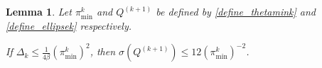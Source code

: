 \documentclass{article}
\newtheorem{lemma}[theorem]{Lemma}
\theoremstyle{case}
\numberwithin{theorem}{subsection}
\newcommand{\bsk}{{\beta_0^{(\star, k)}}}
\newcommand{\dacco}{{\Delta_{\textrm{a}}}}
\newcommand{\dk}{\Delta_k}
\newcommand{\naturals}{\mathbb N}
\newcommand{\thetamink}{{\pi^k_{\textrm{min}}}}
\newcommand{\qkpo}{{Q^{(k+1)}}}
\begin{document}
% 



\begin{lemma}
\label{boundbeta}
Let $\thetamink$ and $\qkpo$ be defined by \cref{define_thetamink} and \cref{define_ellipsek} respectively.

If $\dk \le \frac 1 {4 \beta} \left(\thetamink\right)^2$, then $\sigma\left(\qkpo\right) \le 12 \left(\thetamink\right)^{-2}$.

\end{lemma}
\end{document}
